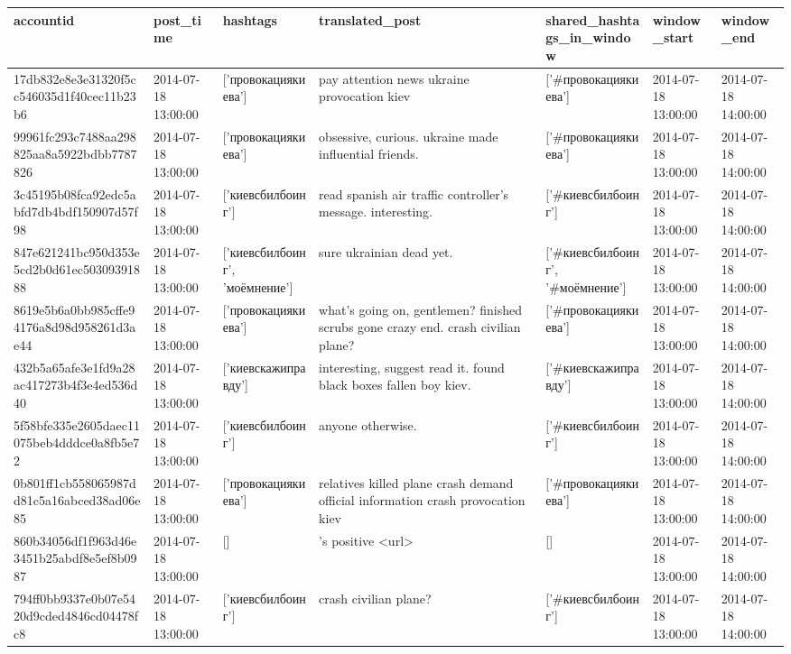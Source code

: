 \begin{tabular}{lllllll}
\toprule
accountid & post\_time & hashtags & translated\_post & shared\_hashtags\_in\_window & window\_start & window\_end \\
\midrule
17db832e8e3e31320f5cc546035d1f40cec11b23b6 & 2014-07-18 13:00:00 & ['провокациякиева'] & pay attention news ukraine provocation kiev & ['#провокациякиева'] & 2014-07-18 13:00:00 & 2014-07-18 14:00:00 \\
99961fc293c7488aa298825aa8a5922bdbb7787826 & 2014-07-18 13:00:00 & ['провокациякиева'] & obsessive, curious. ukraine made influential friends. & ['#провокациякиева'] & 2014-07-18 13:00:00 & 2014-07-18 14:00:00 \\
3c45195b08fca92edc5abfd7db4bdf150907d57f98 & 2014-07-18 13:00:00 & ['киевсбилбоинг'] & read spanish air traffic controller's message. interesting. & ['#киевсбилбоинг'] & 2014-07-18 13:00:00 & 2014-07-18 14:00:00 \\
847e621241bc950d353e5cd2b0d61ec50309391888 & 2014-07-18 13:00:00 & ['киевсбилбоинг', 'моёмнение'] & sure ukrainian dead yet. & ['#киевсбилбоинг', '#моёмнение'] & 2014-07-18 13:00:00 & 2014-07-18 14:00:00 \\
8619e5b6a0bb985cffe94176a8d98d958261d3ae44 & 2014-07-18 13:00:00 & ['провокациякиева'] & what's going on, gentlemen? finished scrubs gone crazy end. crash civilian plane? & ['#провокациякиева'] & 2014-07-18 13:00:00 & 2014-07-18 14:00:00 \\
432b5a65afe3e1fd9a28ac417273b4f3e4ed536d40 & 2014-07-18 13:00:00 & ['киевскажиправду'] & interesting, suggest read it. found black boxes fallen boy kiev. & ['#киевскажиправду'] & 2014-07-18 13:00:00 & 2014-07-18 14:00:00 \\
5f58bfe335e2605daec11075beb4dddce0a8fb5e72 & 2014-07-18 13:00:00 & ['киевсбилбоинг'] & anyone otherwise. & ['#киевсбилбоинг'] & 2014-07-18 13:00:00 & 2014-07-18 14:00:00 \\
0b801ff1cb558065987dd81c5a16abced38ad06e85 & 2014-07-18 13:00:00 & ['провокациякиева'] & relatives killed plane crash demand official information crash provocation kiev & ['#провокациякиева'] & 2014-07-18 13:00:00 & 2014-07-18 14:00:00 \\
860b34056df1f963d46e3451b25abdf8e5ef8b0987 & 2014-07-18 13:00:00 & [] & 's positive <url> & [] & 2014-07-18 13:00:00 & 2014-07-18 14:00:00 \\
794ff0bb9337e0b07e5420d9cded4846cd04478fc8 & 2014-07-18 13:00:00 & ['киевсбилбоинг'] & crash civilian plane? & ['#киевсбилбоинг'] & 2014-07-18 13:00:00 & 2014-07-18 14:00:00 \\

\end{tabular}
